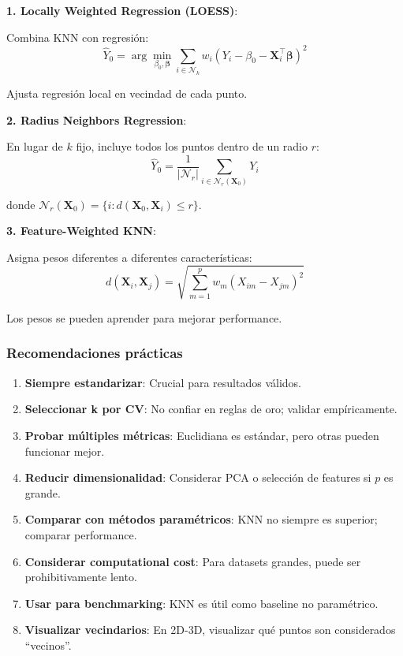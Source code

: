 \documentclass[
  doc,
  floatsintext,
  longtable,
  a4paper,
  nolmodern,
  notxfonts,
  notimes,
  12pt,
  colorlinks=true,linkcolor=blue,citecolor=blue,urlcolor=blue]{apa7}
\begin{document}
\textbf{1. Locally Weighted Regression (LOESS)}:

Combina KNN con regresión: \[
\hat{Y}_0 = \arg\min_{\beta_0, \boldsymbol{\beta}} \sum_{i \in \mathcal{N}_k} w_i (Y_i - \beta_0 - \mathbf{X}_i^\top\boldsymbol{\beta})^2
\]

Ajusta regresión local en vecindad de cada punto.

\textbf{2. Radius Neighbors Regression}:

En lugar de \(k\) fijo, incluye todos los puntos dentro de un radio
\(r\): \[
\hat{Y}_0 = \frac{1}{|\mathcal{N}_r|} \sum_{i \in \mathcal{N}_r(\mathbf{X}_0)} Y_i
\]

donde
\(\mathcal{N}_r(\mathbf{X}_0) = \{i : d(\mathbf{X}_0, \mathbf{X}_i) \leq r\}\).

\textbf{3. Feature-Weighted KNN}:

Asigna pesos diferentes a diferentes características: \[
d(\mathbf{X}_i, \mathbf{X}_j) = \sqrt{\sum_{m=1}^{p} w_m (X_{im} - X_{jm})^2}
\]

Los pesos se pueden aprender para mejorar performance.

\subsubsection{Recomendaciones
prácticas}\label{recomendaciones-pruxe1cticas-2}

\begin{enumerate}
\def\labelenumi{\arabic{enumi}.}
\item
  \textbf{Siempre estandarizar}: Crucial para resultados válidos.
\item
  \textbf{Seleccionar k por CV}: No confiar en reglas de oro; validar
  empíricamente.
\item
  \textbf{Probar múltiples métricas}: Euclidiana es estándar, pero otras
  pueden funcionar mejor.
\item
  \textbf{Reducir dimensionalidad}: Considerar PCA o selección de
  features si \(p\) es grande.
\item
  \textbf{Comparar con métodos paramétricos}: KNN no siempre es
  superior; comparar performance.
\item
  \textbf{Considerar computational cost}: Para datasets grandes, puede
  ser prohibitivamente lento.
\item
  \textbf{Usar para benchmarking}: KNN es útil como baseline no
  paramétrico.
\item
  \textbf{Visualizar vecindarios}: En 2D-3D, visualizar qué puntos son
  considerados ``vecinos''.
\end{enumerate}
\end{document}

